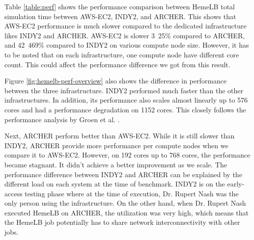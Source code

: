 \noindent%
\begin{minipage}{\linewidth}%
 \label{fig:hemelb-perf-overview}%
\end{minipage}

\vspace{0.5cm}


Table \ref{table:perf} shows the performance comparison between HemeLB total simulation time between AWS-EC2, INDY2, and ARCHER. This shows that AWS-EC2 performance is much slower compared to the dedicated infrastructure likes INDY2 and ARCHER. AWS-EC2 is slower 3~25\% compared to ARCHER, and 42~469\% compared to INDY2 on various compute node size. However, it has to be noted  that on each infrastructure, one compute node have different core count. This could affect the performance difference we got from this result.

Figure \ref{fig:hemelb-perf-overview} also shows the difference in performance between the three infrastructure. INDY2 performed much faster than the other infrastructures. In addition, its performance also scales almost linearly up to 576 cores and had a performance degradation on 1152 cores. This closely follows the performance analysis by Groen et al. \citep{groen2013analysing}. 

Next, ARCHER perform better than AWS-EC2. While it is still slower than INDY2, ARCHER provide more performance per compute nodes when we compare it to AWS-EC2. However, on 192 cores up to 768 cores, the performance became stagnant. It didn't achieve a better improvement as we scale. The performance difference between INDY2 and ARCHER can be explained by the different load on each system at the time of benchmark. INDY2 is on the early-access testing phase where at the time of execution, Dr. Rupert Nash was the only person using the infrastructure. On the other hand, when Dr. Rupert Nash executed HemeLB on ARCHER, the utilization was very high, which means that the HemeLB job potentially has to share network interconnectivity with other jobs.

